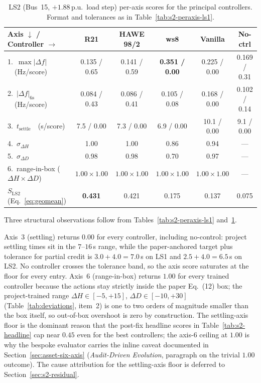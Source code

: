 \documentclass{unnc-fyp}
\begin{document}
\begin{table}[tb]
  \centering
  \small
  \caption{LS2 (Bus~15, $+1.88$\,p.u.\ load step) per-axis scores
           for the principal controllers. Format and tolerances as
           in Table~\ref{tab:s2-peraxis-ls1}.}
  \label{tab:s2-peraxis-ls2}
  \begin{tabular}{@{}lccccc@{}}
    \toprule
    Axis $\downarrow$ / Controller $\rightarrow$
      & R21 & HAWE 98/2 & ws8 & Vanilla & No-ctrl \\
    \midrule
    1.\ $\max|\Delta f|$\ \ (Hz/score)
      & 0.135 / 0.65 & 0.141 / 0.59 & \textbf{0.351 / 0.00} & 0.225 / 0.00 & 0.169 / 0.31 \\
    2.\ $|\Delta f|_{6\mathrm{s}}$\ \ (Hz/score)
      & 0.084 / 0.43 & 0.086 / 0.41 & 0.105 / 0.08 & 0.168 / 0.00 & 0.102 / 0.14 \\
    3.\ $t_\mathrm{settle}$\ \ (s/score)
      & 7.5 / 0.00 & 7.3 / 0.00 & 6.9 / 0.00 & 10.1 / 0.00 & 9.1 / 0.00 \\
    4.\ $\sigma_{\Delta H}$
      & 1.00 & 1.00 & 0.86 & 0.94 & --- \\
    5.\ $\sigma_{\Delta D}$
      & 0.98 & 0.98 & 0.70 & 0.97 & --- \\
    6.\ range-in-box ($\Delta H \times \Delta D$)
      & $1.00 \times 1.00$ & $1.00 \times 1.00$ & $1.00 \times 1.00$ & $1.00 \times 1.00$ & --- \\
    \midrule
    $S_\mathrm{LS2}$ (Eq.~\eqref{eq:geomean})
      & \textbf{0.431} & 0.421 & 0.175 & 0.137 & 0.075 \\
    \bottomrule
  \end{tabular}
\end{table}

Three structural observations follow from
Tables~\ref{tab:s2-peraxis-ls1} and~\ref{tab:s2-peraxis-ls2}.

Axis~3 (settling) returns $0.00$ for every controller, including
no-control: project settling times sit in the $7$--$16$\,s range,
while the paper-anchored target plus tolerance for partial credit
is $3.0 + 4.0 = 7.0$\,s on LS1 and $2.5 + 4.0 = 6.5$\,s on LS2.
No controller crosses the tolerance band, so the axis score
saturates at the floor for every entry.
Axis~6 (range-in-box) returns $1.00$ for every trained controller
because the actions stay strictly inside the paper Eq.~(12) box;
the project-trained range
$\Delta H \in [-5, +15]$, $\Delta D \in [-10, +30]$
(Table~\ref{tab:deviations}, item~2) is one to two orders of
magnitude smaller than the box itself, so out-of-box overshoot is
zero by construction.
The settling-axis floor is the dominant reason that the
post-fix headline scores in Table~\ref{tab:s2-headline} cap near
$0.45$ even for the best controllers; the axis-6 ceiling at $1.00$
is why the bespoke evaluator carries the inline caveat documented
in Section~\ref{sec:asset-six-axis}
(\emph{Audit-Driven Evolution}, paragraph on the trivial $1.00$
outcome).
The cause attribution for the settling-axis floor is deferred to
Section~\ref{sec:s2-residual}.
\end{document}
